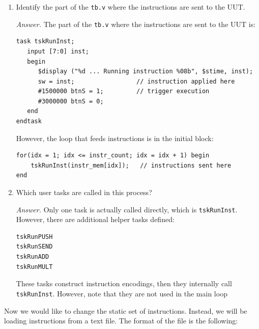 \documentclass[10pt,letterpaper]{article}
\begin{document}
\begin{enumerate}
    \item Identify the part of the \texttt{tb.v} where the instructions are sent to the UUT.

    \textit{Answer.} The part of the \texttt{tb.v} where the instructions are sent to the UUT is:\\
    
    \begin{mdframed}
    \begin{verbatim}
task tskRunInst;
   input [7:0] inst;
   begin
      $display ("%d ... Running instruction %08b", $stime, inst);
      sw = inst;                 // instruction applied here
      #1500000 btnS = 1;         // trigger execution
      #3000000 btnS = 0;
   end
endtask
    \end{verbatim}
    \end{mdframed}
    However, the loop that feeds instructions is in the initial block:\\

    \begin{mdframed}
    \begin{verbatim}
for(idx = 1; idx <= instr_count; idx = idx + 1) begin
    tskRunInst(instr_mem[idx]);   // instructions sent here
end
    \end{verbatim}
    \end{mdframed}
    
    \item Which user tasks are called in this process?

    \textit{Answer.} Only one task is actually called directly, which is \verb|tskRunInst|. However, there are additional helper tasks defined:\\
    
    \begin{mdframed}
    \begin{verbatim}
tskRunPUSH
tskRunSEND
tskRunADD
tskRunMULT
    \end{verbatim}
    \end{mdframed}

    These tasks construct instruction encodings, then they internally call \verb|tskRunInst|. However, note that they are not used in the main loop
\end{enumerate}

Now we would like to change the static set of instructions. Instead, we will be loading instructions from a text file. The format of the file is the following:
\end{document}

